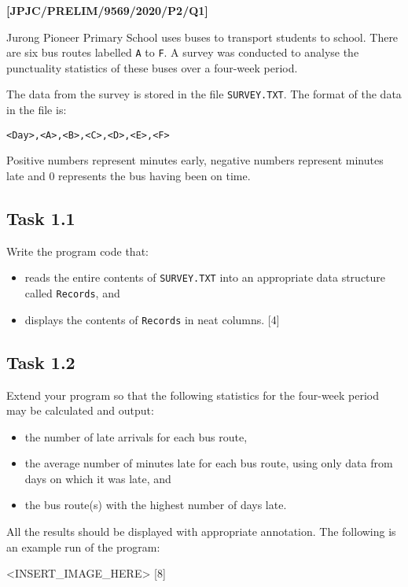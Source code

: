 \item \textbf{{[}JPJC/PRELIM/9569/2020/P2/Q1{]} }

Jurong Pioneer Primary School uses buses to transport students to
school. There are six bus routes labelled \texttt{A} to \texttt{F}.
A survey was conducted to analyse the punctuality statistics of these
buses over a four-week period.

The data from the survey is stored in the file \texttt{SURVEY.TXT}.
The format of the data in the file is: 
\noindent \begin{center}
\texttt{<Day>,<A>,<B>,<C>,<D>,<E>,<F>} 
\par\end{center}

Positive numbers represent minutes early, negative numbers represent
minutes late and 0 represents the bus having been on time. 

\subsection*{Task 1.1 }

Write the program code that: 
\begin{itemize}
\item reads the entire contents of \texttt{SURVEY.TXT} into an appropriate
data structure called \texttt{Records}, and 
\item displays the contents of \texttt{Records} in neat columns. \hfill{}{[}4{]}
\end{itemize}

\subsection*{Task 1.2 }

Extend your program so that the following statistics for the four-week
period may be calculated and output: 
\begin{itemize}
\item the number of late arrivals for each bus route,
\item the average number of minutes late for each bus route, using only
data from days on which it was late, and 
\item the bus route(s) with the highest number of days late. 
\end{itemize}
All the results should be displayed with appropriate annotation. The
following is an example run of the program: 
\noindent \begin{center}
<INSERT\_IMAGE\_HERE> \hfill{}{[}8{]}
\par\end{center}

